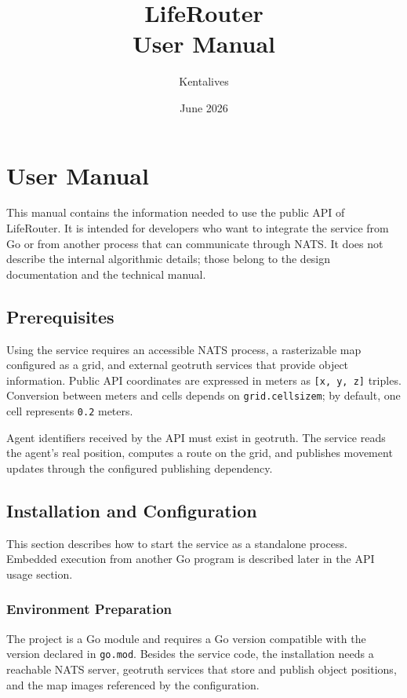 \documentclass[12pt,a4paper]{report}
\title{LifeRouter\\User Manual}
\author{Kentalives}
\date{June 2026}
\begin{document}
\maketitle
\setcounter{page}{2}
\tableofcontents
\clearpage
{}

\chapter{User Manual}

This manual contains the information needed to use the public API of LifeRouter.
 It is intended for developers who want to integrate the
service from Go or from another process that can communicate through NATS. It
does not describe the internal algorithmic details; those belong to the design
documentation and the technical manual.

\section{Prerequisites}

Using the service requires an accessible NATS process, a rasterizable map
configured as a grid, and external geotruth services that provide object
information. Public API coordinates are expressed in meters as
\texttt{[x, y, z]} triples. Conversion between meters and cells depends on
\texttt{grid.cellsizem}; by default, one cell represents \texttt{0.2} meters.

Agent identifiers received by the API must exist in geotruth. The service reads
the agent's real position, computes a route on the grid, and publishes movement
updates through the configured publishing dependency.

\section{Installation and Configuration}

This section describes how to start the service as a standalone process.
Embedded execution from another Go program is described later in the API usage
section.

\subsection{Environment Preparation}

The project is a Go module and requires a Go version compatible with the version
declared in \texttt{go.mod}. Besides the service code, the installation needs a
reachable NATS server, geotruth services that store and publish object
positions, and the map images referenced by the configuration.
\end{document}
